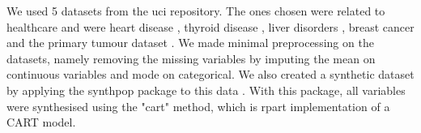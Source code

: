 We used 5 datasets from the \ac{uci} repository. The ones chosen were related to healthcare and were heart disease \cite{misc_heart_disease_45}, thyroid disease \cite{misc_thyroid_disease_102}, liver disorders \cite{misc_liver_disorders_60}, breast cancer \cite{misc_breast_cancer_wisconsin_(diagnostic)_17} and the primary tumour dataset \cite{misc_primary_tumor_83}. We made minimal preprocessing on the datasets, namely removing the missing variables by imputing the mean on continuous variables and mode on categorical.
We also created a synthetic dataset by applying the synthpop package to this data \cite{synthpop}. With this package, all variables were synthesised using the "cart" method, which is rpart implementation of a CART model.

